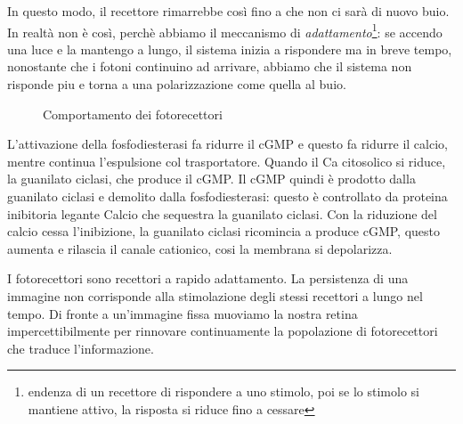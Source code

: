 \documentclass[a4paper,12pt]{article}
\begin{document}
In questo modo, il recettore rimarrebbe così fino a che non ci sarà di nuovo buio. In realtà non è così, perchè abbiamo il meccanismo di \emph{adattamento}\footnote{endenza di un recettore di rispondere a uno stimolo, poi se lo stimolo si mantiene attivo, la risposta si riduce fino a cessare}: se accendo una luce e la mantengo a lungo, il sistema inizia a rispondere ma in breve tempo, nonostante che i fotoni continuino ad arrivare, abbiamo che il sistema non risponde piu e torna a una polarizzazione come quella al buio. 

\begin{figure}[H]
 \centering
  \quad
{}
    \caption{Comportamento dei fotorecettori}
\end{figure}

L'attivazione della fosfodiesterasi fa ridurre il cGMP e questo fa ridurre il calcio, mentre continua l'espulsione col trasportatore. Quando il Ca citosolico si riduce, la guanilato ciclasi, che produce il cGMP. Il cGMP quindi è prodotto dalla guanilato ciclasi e demolito dalla fosfodiesterasi: questo è controllato da proteina inibitoria legante Calcio che sequestra la guanilato ciclasi. Con la riduzione del calcio cessa l'inibizione, la guanilato ciclasi ricomincia a produce cGMP, questo aumenta e rilascia il canale cationico, cosi la membrana si depolarizza.

I fotorecettori sono recettori a rapido adattamento. La persistenza di una immagine non corrisponde alla stimolazione degli stessi recettori a lungo nel tempo. Di fronte a un'immagine fissa muoviamo la nostra retina impercettibilmente per rinnovare continuamente la popolazione di fotorecettori che traduce l'informazione. 
\end{document}
